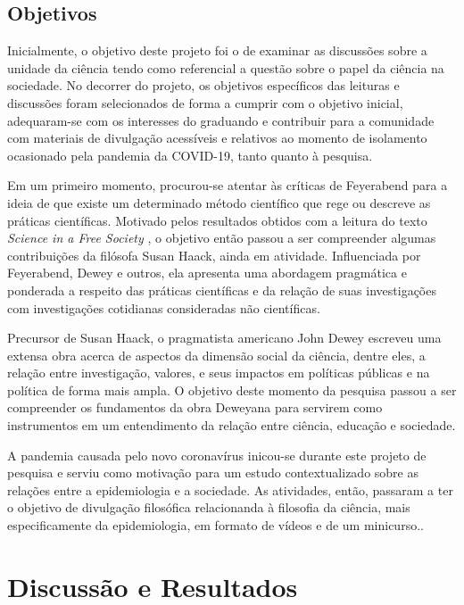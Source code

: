 \documentclass[12pt]{report}
\begin{document}
		\section*{Objetivos}
			Inicialmente, o objetivo deste projeto foi o de examinar as discussões sobre a unidade da ciência tendo como referencial a questão sobre o papel da ciência na sociedade.
			No decorrer do projeto, os objetivos específicos das leituras e discussões foram selecionados de forma a cumprir com o objetivo inicial, adequaram-se com os interesses do graduando e contribuir para a comunidade com materiais de divulgação acessíveis e relativos ao momento de isolamento ocasionado pela pandemia da COVID-19, tanto quanto à pesquisa.
			
			Em um primeiro momento, procurou-se atentar às críticas de Feyerabend para a ideia de que existe um determinado método científico que rege ou descreve as práticas científicas.
			Motivado pelos resultados obtidos com a leitura do texto \textit{Science in a Free Society} \cite{feyerabend-science-free-society}, o objetivo então passou a ser compreender algumas contribuições da filósofa Susan Haack, ainda em atividade.
			Influenciada por Feyerabend, Dewey e outros, ela apresenta uma abordagem pragmática e ponderada a respeito das práticas científicas e da relação de suas investigações com investigações cotidianas consideradas não científicas.
			
			Precursor de Susan Haack, o pragmatista americano John Dewey escreveu uma extensa obra acerca de aspectos da dimensão social da ciência, dentre eles, a relação entre investigação, valores, e seus impactos em políticas públicas e na política de forma mais ampla.
			O objetivo deste momento da pesquisa passou a ser compreender os fundamentos da obra Deweyana para servirem como instrumentos em um entendimento da relação entre ciência, educação e sociedade.
			
			A pandemia causada pelo novo coronavírus inicou-se durante este projeto de pesquisa e serviu como motivação para um estudo contextualizado sobre as relações entre a epidemiologia e a sociedade.
			As atividades, então, passaram a ter o objetivo de divulgação filosófica relacionanda à filosofia da ciência, mais especificamente da epidemiologia, em formato de vídeos e de um minicurso..
	
	\vspace*{-0.6cm}
	\chapter*{Discussão e Resultados}
	\vspace*{-0.75cm}
	
\end{document}

